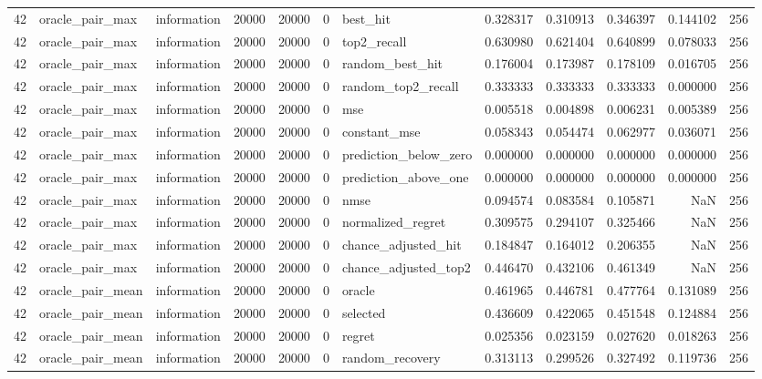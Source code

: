 \begin{tabular}{rllrrrlrrrrr}
42 & oracle_pair_max & information & 20000 & 20000 & 0 & best_hit & 0.328317 & 0.310913 & 0.346397 & 0.144102 & 256 \\
42 & oracle_pair_max & information & 20000 & 20000 & 0 & top2_recall & 0.630980 & 0.621404 & 0.640899 & 0.078033 & 256 \\
42 & oracle_pair_max & information & 20000 & 20000 & 0 & random_best_hit & 0.176004 & 0.173987 & 0.178109 & 0.016705 & 256 \\
42 & oracle_pair_max & information & 20000 & 20000 & 0 & random_top2_recall & 0.333333 & 0.333333 & 0.333333 & 0.000000 & 256 \\
42 & oracle_pair_max & information & 20000 & 20000 & 0 & mse & 0.005518 & 0.004898 & 0.006231 & 0.005389 & 256 \\
42 & oracle_pair_max & information & 20000 & 20000 & 0 & constant_mse & 0.058343 & 0.054474 & 0.062977 & 0.036071 & 256 \\
42 & oracle_pair_max & information & 20000 & 20000 & 0 & prediction_below_zero & 0.000000 & 0.000000 & 0.000000 & 0.000000 & 256 \\
42 & oracle_pair_max & information & 20000 & 20000 & 0 & prediction_above_one & 0.000000 & 0.000000 & 0.000000 & 0.000000 & 256 \\
42 & oracle_pair_max & information & 20000 & 20000 & 0 & nmse & 0.094574 & 0.083584 & 0.105871 & NaN & 256 \\
42 & oracle_pair_max & information & 20000 & 20000 & 0 & normalized_regret & 0.309575 & 0.294107 & 0.325466 & NaN & 256 \\
42 & oracle_pair_max & information & 20000 & 20000 & 0 & chance_adjusted_hit & 0.184847 & 0.164012 & 0.206355 & NaN & 256 \\
42 & oracle_pair_max & information & 20000 & 20000 & 0 & chance_adjusted_top2 & 0.446470 & 0.432106 & 0.461349 & NaN & 256 \\
42 & oracle_pair_mean & information & 20000 & 20000 & 0 & oracle & 0.461965 & 0.446781 & 0.477764 & 0.131089 & 256 \\
42 & oracle_pair_mean & information & 20000 & 20000 & 0 & selected & 0.436609 & 0.422065 & 0.451548 & 0.124884 & 256 \\
42 & oracle_pair_mean & information & 20000 & 20000 & 0 & regret & 0.025356 & 0.023159 & 0.027620 & 0.018263 & 256 \\
42 & oracle_pair_mean & information & 20000 & 20000 & 0 & random_recovery & 0.313113 & 0.299526 & 0.327492 & 0.119736 & 256 \\

\end{tabular}
